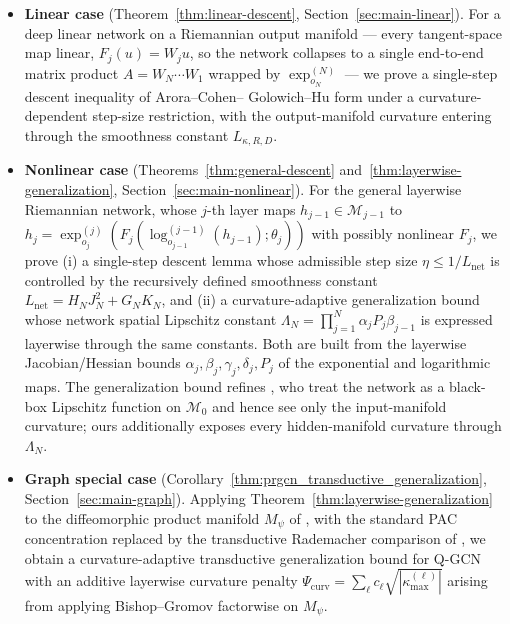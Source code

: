 \documentclass[letterpaper]{article}
\begin{document}
\begin{itemize}[leftmargin=1.4em, itemsep=4pt]
\item \textbf{Linear case} (Theorem~\ref{thm:linear-descent},
Section~\ref{sec:main-linear}). For a deep linear network on a Riemannian
output manifold --- every tangent-space map linear, $F_j(u) = W_j u$, so
the network collapses to a single end-to-end matrix product
$A = W_N \cdots W_1$ wrapped by $\exp_{o_N}^{(N)}$ --- we prove a
single-step descent inequality of Arora--\allowbreak Cohen--\allowbreak
Golowich--\allowbreak Hu form under a
curvature-dependent step-size restriction, with the output-manifold
curvature entering through the smoothness constant $L_{\kappa,R,D}$.

\item \textbf{Nonlinear case} (Theorems~\ref{thm:general-descent}
and~\ref{thm:layerwise-generalization}, Section~\ref{sec:main-nonlinear}).
For the general layerwise Riemannian network, whose $j$-th layer maps
$h_{j-1}\in\mathcal M_{j-1}$ to
$h_j = \exp_{o_j}^{(j)}(F_j(\log_{o_{j-1}}^{(j-1)}(h_{j-1}); \theta_j))$
with possibly nonlinear $F_j$, we prove (i) a single-step descent lemma
whose admissible step size $\eta \le 1/L_{\mathrm{net}}$ is controlled by
the recursively defined smoothness constant
$L_{\mathrm{net}} = H_N J_N^2 + G_N K_N$, and (ii) a curvature-adaptive
generalization bound whose network spatial Lipschitz constant
$\Lambda_N = \prod_{j=1}^N \alpha_j P_j \beta_{j-1}$ is expressed
layerwise through the same constants. Both are built from the layerwise
Jacobian/Hessian bounds $\alpha_j, \beta_j, \gamma_j, \delta_j, P_j$ of
the exponential and logarithmic maps. The generalization bound refines
\cite{sarkar2025learning}, who treat the network as a black-box Lipschitz
function on $\mathcal M_0$ and hence see only the input-manifold
curvature; ours additionally exposes every hidden-manifold curvature
through $\Lambda_N$.

\item \textbf{Graph special case}
(Corollary~\ref{thm:prgcn_transductive_generalization},
Section~\ref{sec:main-graph}). Applying
Theorem~\ref{thm:layerwise-generalization} to the diffeomorphic product
manifold $M_\psi$ of \cite{xiong2022pseudo}, with the standard PAC
concentration replaced by the transductive Rademacher comparison of
\cite{tang2023towards}, we obtain a curvature-adaptive transductive
generalization bound for Q-GCN with an additive layerwise curvature
penalty $\Psi_{\mathrm{curv}} = \sum_\ell c_\ell
\sqrt{|\kappa^{(\ell)}_{\max}|}$ arising from applying Bishop--Gromov
factorwise on $M_\psi$.
\end{itemize}
\end{document}
